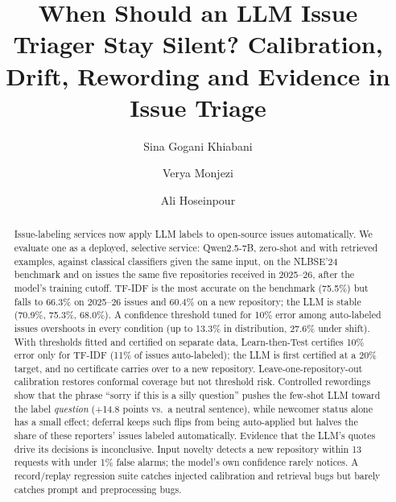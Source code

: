 \documentclass[sigconf,review=false,anonymous=false]{acmart}
\begin{document}
\title{When Should an LLM Issue Triager Stay Silent? Calibration, Drift, Rewording and Evidence in Issue Triage}

\author{Sina Gogani Khiabani}
\author{Verya Monjezi}
\author{Ali Hoseinpour}

\begin{abstract}
Issue-labeling services now apply LLM labels to open-source issues automatically. We evaluate one
as a deployed, selective service: Qwen2.5-7B, zero-shot and with retrieved examples, against
classical classifiers given the same input, on the NLBSE'24 benchmark and on issues the same five
repositories received in 2025--26, after the model's training cutoff. TF-IDF is the most accurate on
the benchmark (75.5\%) but falls to 66.3\% on 2025--26 issues and 60.4\% on a new repository; the LLM
is stable (70.9\%, 75.3\%, 68.0\%). A confidence threshold tuned for 10\% error among auto-labeled
issues overshoots in every condition (up to 13.3\% in distribution, 27.6\% under shift). With
thresholds fitted and certified on separate data, Learn-then-Test certifies 10\% error only for
TF-IDF (11\% of issues auto-labeled); the LLM is first certified at a 20\% target, and no certificate
carries over to a new repository. Leave-one-repository-out calibration restores conformal coverage
but not threshold risk. Controlled rewordings show that the phrase ``sorry if this is a silly
question'' pushes the few-shot LLM toward the label \emph{question} (+14.8 points vs.\ a neutral
sentence), while newcomer status alone has a small effect; deferral keeps such flips from being
auto-applied but halves the share of these reporters' issues labeled automatically. Evidence that
the LLM's quotes drive its decisions is inconclusive. Input novelty detects a new repository within
13 requests with under 1\% false alarms; the model's own confidence rarely notices. A record/replay
regression suite catches injected calibration and retrieval bugs but barely catches prompt and
preprocessing bugs.
\end{abstract}


\maketitle









\end{document}
